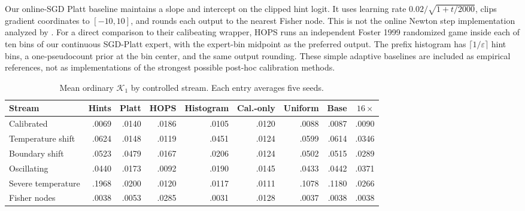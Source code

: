 \documentclass{article}
\newcommand{\calK}{\mathcal{K}}
\begin{document}
Our online-SGD Platt baseline maintains a slope and intercept on the clipped hint logit. It uses learning rate $0.02/\sqrt{1+t/2000}$, clips gradient coordinates to $[-10,10]$, and rounds each output to the nearest Fisher node. This is not the online Newton step implementation analyzed by \citet{gupta2023online}. For a direct comparison to their calibeating wrapper, HOPS runs an independent Foster 1999 randomized game inside each of ten bins of our continuous SGD-Platt expert, with the expert-bin midpoint as the preferred output. The prefix histogram has $\lceil1/\varepsilon\rceil$ hint bins, a one-pseudocount prior at the bin center, and the same output rounding. These simple adaptive baselines are included as empirical references, not as implementations of the strongest possible post-hoc calibration methods.

\begin{table}[h]
\centering
\caption{Mean ordinary $\calK_1$ by controlled stream. Each entry averages
five seeds.}
\label{tab:synthetic-k1-full}
\scriptsize
\begin{tabular}{lrrrrrrrr}
\toprule
Stream & Hints & Platt & HOPS & Histogram & Cal.-only & Uniform & Base & $16\times$\\
\midrule
Calibrated & .0069 & .0140 & .0186 & .0105 & .0120 & .0088 & .0087 & .0090\\
Temperature shift & .0624 & .0148 & .0119 & .0451 & .0124 & .0599 & .0614 & .0346\\
Boundary shift & .0523 & .0479 & .0167 & .0206 & .0124 & .0502 & .0515 & .0289\\
Oscillating & .0440 & .0173 & .0092 & .0190 & .0145 & .0433 & .0442 & .0371\\
Severe temperature & .1968 & .0200 & .0120 & .0117 & .0111 & .1078 & .1180 & .0266\\
Fisher nodes & .0038 & .0053 & .0285 & .0031 & .0128 & .0037 & .0038 & .0038\\
\bottomrule
\end{tabular}
\end{table}
\end{document}
